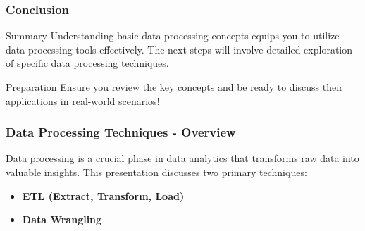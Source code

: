 \documentclass[aspectratio=169]{beamer}
\begin{document}
\begin{frame}[fragile]
    \frametitle{Conclusion}
    \begin{block}{Summary}
        Understanding basic data processing concepts equips you to utilize data processing tools effectively. 
        The next steps will involve detailed exploration of specific data processing techniques.
    \end{block}
    \begin{block}{Preparation}
        Ensure you review the key concepts and be ready to discuss their applications in real-world scenarios!
    \end{block}
\end{frame}

\begin{frame}[fragile]
    \frametitle{Data Processing Techniques - Overview}
    Data processing is a crucial phase in data analytics that transforms raw data into valuable insights. This presentation discusses two primary techniques:
    
    \begin{itemize}
        \item \textbf{ETL (Extract, Transform, Load)}
        \item \textbf{Data Wrangling}
    \end{itemize}
\end{frame}
\end{document}
